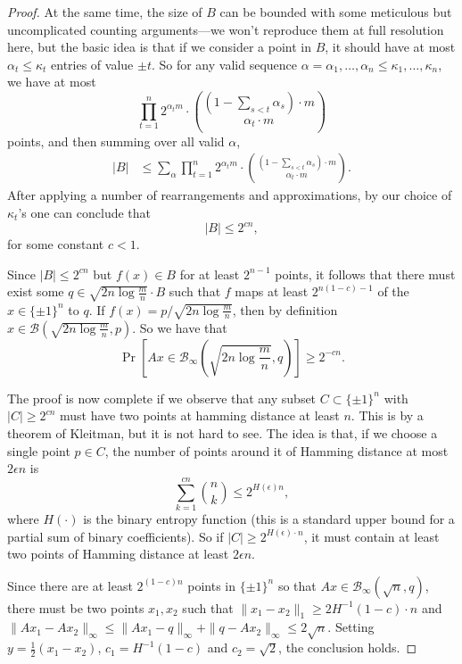 \documentclass{article}
\theoremstyle{theorem}
\theoremstyle{definition}
\newcommand{\cB}{\mathcal{B}}
\begin{document}
\begin{proof}
    At the same time, the size of $B$ can be bounded with some meticulous but uncomplicated counting arguments---we won't reproduce them at full resolution here, but the basic idea is that if we consider a point in $B$, it should have at most $\alpha_t \le \kappa_t$ entries of value $\pm t$.
    So for any valid sequence $\alpha = \alpha_1,\ldots,\alpha_n \le \kappa_1,\ldots,\kappa_n$, we have at most
    \[
	\prod_{t=1}^{n}2^{\alpha_t m} \cdot \binom{\left(1 - \sum_{s < t}\alpha_s\right)\cdot m}{\alpha_t \cdot m}
    \]
    points, and then summing over all valid $\alpha$,
    \begin{align*}
	|B|
	&\le \sum_{\alpha}
	\prod_{t=1}^{n}2^{\alpha_t m} \cdot \binom{\left(1 - \sum_{s < t}\alpha_s\right)\cdot m}{\alpha_t \cdot m}.
    \end{align*}
    After applying a number of rearrangements and approximations, by our choice of $\kappa_t$'s one can conclude that
    \[
	|B| \le 2^{cn},
    \]
for some constant $c < 1$.

\medskip

    Since $|B| \le 2^{cn}$ but $f(x) \in B$ for at least $2^{n-1}$ points, it follows that there must exist some $q \in \sqrt{2n\log\frac{m}{n}}\cdot B$ such that $f$ maps at least $2^{n(1-c) -1}$ of the $x \in \{\pm 1\}^n$ to $q$.
    If $f(x) = p/\sqrt{2n\log \frac{m}{n}}$, then by definition $x \in \cB(\sqrt{2n\log \frac{m}{n}}, p)$.
    So we have that
    \[
	\Pr\left[Ax \in \cB_{\infty}\left(\sqrt{2n\log\frac{m}{n}}, q\right)\right] \ge 2^{-cn}.
    \]

The proof is now complete if we observe that any subset $C \subset \{\pm 1\}^n$ with  $|C| \ge 2^{cn}$ must have two points at hamming distance at least $n$.
This is by a theorem of Kleitman, but it is not hard to see.
The idea is that, if we choose a single point $p \in C$, the number of points around it of Hamming distance at most $2\epsilon n$ is
\[
    \sum_{k=1}^{cn} \binom{n}{k} \le 2^{H(\epsilon)n},
\]
where $H(\cdot)$ is the binary entropy function (this is a standard upper bound for a partial sum of binary coefficients).
So if $|C| \ge 2^{ H(\epsilon)\cdot n}$, it must contain at least two points of Hamming distance at least $2\epsilon n$.

Since there are at least $2^{(1-c)n}$ points in $\{\pm 1\}^n$ so that $Ax \in \cB_{\infty}(\sqrt{n},q)$, there must be two points $x_1,x_2$ such that $\|x_1-x_2\|_1 \ge 2H^{-1}(1-c)\cdot n$ and $\|Ax_1 - Ax_2\|_{\infty} \le \|Ax_1 - q\|_{\infty} + \|q - Ax_2\|_{\infty} \le 2\sqrt{n}$.
Setting $y = \frac{1}{2}(x_1-x_2)$, $c_1 = H^{-1}(1-c)$ and $c_2 = \sqrt{2}$, the conclusion holds.
\end{proof}
\end{document}
